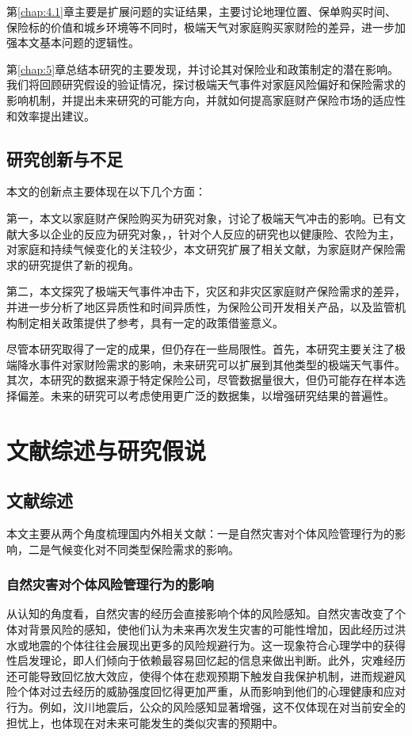 第\ref{chap:4.1}章主要是扩展问题的实证结果，主要讨论地理位置、保单购买时间、保险标的价值和城乡环境等不同时，极端天气对家庭购买家财险的差异，进一步加强本文基本问题的逻辑性。

第\ref{chap:5}章总结本研究的主要发现，并讨论其对保险业和政策制定的潜在影响。我们将回顾研究假设的验证情况，探讨极端天气事件对家庭风险偏好和保险需求的影响机制，并提出未来研究的可能方向，并就如何提高家庭财产保险市场的适应性和效率提出建议。
\section{研究创新与不足}
本文的创新点主要体现在以下几个方面：

第一，本文以家庭财产保险购买为研究对象，讨论了极端天气冲击的影响。已有文献大多以企业的反应为研究对象\citep{0Do}，，针对个人反应的研究也以健康险\citep{赵强2021空气污染对商业健康保险需求的影响}、农险\citep{胡新艳2021气候变化}为主，对家庭和持续气候变化的关注较少，本文研究扩展了相关文献，为家庭财产保险需求的研究提供了新的视角。

第二，本文探究了极端天气事件冲击下，灾区和非灾区家庭财产保险需求的差异，并进一步分析了地区异质性和时间异质性，为保险公司开发相关产品，以及监管机构制定相关政策提供了参考，具有一定的政策借鉴意义。

尽管本研究取得了一定的成果，但仍存在一些局限性。首先，本研究主要关注了极端降水事件对家财险需求的影响，未来研究可以扩展到其他类型的极端天气事件。其次，本研究的数据来源于特定保险公司，尽管数据量很大，但仍可能存在样本选择偏差。未来的研究可以考虑使用更广泛的数据集，以增强研究结果的普遍性。

\chapter{文献综述与研究假说}\label{chap:2}
\section{文献综述}

本文主要从两个角度梳理国内外相关文献：一是自然灾害对个体风险管理行为的影响，二是气候变化对不同类型保险需求的影响。

\subsection{自然灾害对个体风险管理行为的影响}\label{sec:disaster}

从认知的角度看，自然灾害的经历会直接影响个体的风险感知。自然灾害改变了个体对背景风险的感知，使他们认为未来再次发生灾害的可能性增加\citep{dillenberger2015history,ZGRK202210006}，因此经历过洪水或地震的个体往往会展现出更多的风险规避行为\citep{cameron2015risk,cassar2017trust}。这一现象符合心理学中的获得性启发理论\citep{tversky1973availability,0Do}，即人们倾向于依赖最容易回忆起的信息来做出判断。此外，灾难经历还可能导致回忆放大效应\citep{heir2009longitudinal,cheong2022natural}，使得个体在悲观预期下触发自我保护机制，进而规避风险个体对过去经历的威胁强度回忆得更加严重\citep{dillenberger2015history}，从而影响到他们的心理健康和应对行为。例如，汶川地震后，公众的风险感知显著增强，这不仅体现在对当前安全的担忧上，也体现在对未来可能发生的类似灾害的预期中\citep{李华强2009突发性灾害中的公众风险感知与应急管理,贾建民2008汶川地震重灾区与非重灾区民众风险感知对比分析}。

